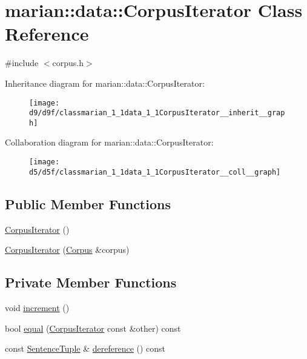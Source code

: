 \hypertarget{classmarian_1_1data_1_1CorpusIterator}{}\section{marian\+:\+:data\+:\+:Corpus\+Iterator Class Reference}
\label{classmarian_1_1data_1_1CorpusIterator}


{\ttfamily \#include $<$corpus.\+h$>$}



Inheritance diagram for marian\+:\+:data\+:\+:Corpus\+Iterator\+:
\nopagebreak
\begin{figure}[H]
\begin{center}
\leavevmode
\texttt{[image: d9/d9f/classmarian\_1\_1data\_1\_1CorpusIterator\_\_inherit\_\_graph]}
\end{center}
\end{figure}


Collaboration diagram for marian\+:\+:data\+:\+:Corpus\+Iterator\+:
\nopagebreak
\begin{figure}[H]
\begin{center}
\leavevmode
\texttt{[image: d5/d5f/classmarian\_1\_1data\_1\_1CorpusIterator\_\_coll\_\_graph]}
\end{center}
\end{figure}
\subsection*{Public Member Functions}
\begin{DoxyCompactItemize}
\item 
\hyperlink{classmarian_1_1data_1_1CorpusIterator_a92c02bbdf32a86020a67fa8b1c7dadd1}{Corpus\+Iterator} ()
\item 
\hyperlink{classmarian_1_1data_1_1CorpusIterator_a764a04bff4c5198bab87349daaa2c8dd}{Corpus\+Iterator} (\hyperlink{classmarian_1_1data_1_1Corpus}{Corpus} \&corpus)
\end{DoxyCompactItemize}
\subsection*{Private Member Functions}
\begin{DoxyCompactItemize}
\item 
void \hyperlink{classmarian_1_1data_1_1CorpusIterator_a5ed84552327c21fb556a1d0185990b9d}{increment} ()
\item 
bool \hyperlink{classmarian_1_1data_1_1CorpusIterator_a4812630a233e6cf5e2412ebcb2b68bd7}{equal} (\hyperlink{classmarian_1_1data_1_1CorpusIterator}{Corpus\+Iterator} const \&other) const 
\item 
const \hyperlink{classmarian_1_1data_1_1SentenceTuple}{Sentence\+Tuple} \& \hyperlink{classmarian_1_1data_1_1CorpusIterator_a06c4c53091baf2ecb4a1afc756778c6f}{dereference} () const 
\end{DoxyCompactItemize}
